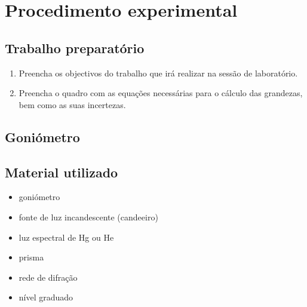 \documentclass[a4paper,twoside,11pt]{report}      %
\begin{document}
\newpage
\section{\sf Procedimento experimental}

\subsection{\sf Trabalho preparatório} 
\begin{enumerate}
\item Preencha os objectivos do trabalho que irá realizar na sessão de laboratório. 
\item Preencha o quadro com as equações necessárias para o cálculo das grandezas, bem como as suas incertezas. 
\end{enumerate}

\subsection{\sf Goniómetro}

\subsection*{\sf Material utilizado}

\begin{itemize}
\item goniómetro
\item fonte de luz incandescente (candeeiro)
\item luz espectral de Hg ou He
\item prisma
\item rede de difração
\item nível graduado
\end{itemize}

\\
\end{document}

